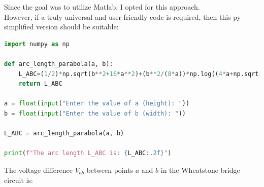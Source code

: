 \documentclass[a4paper, 12pt]{report}
\begin{document}
    Since the goal was to utilize Matlab, I opted for this approach.\\ However, if a truly universal and user-friendly code is required, then this py simplified version should be suitable:
    
    \begin{lstlisting}[style=mypythonstyle,language=Python]
import numpy as np

def arc_length_parabola(a, b):
    L_ABC=(1/2)*np.sqrt(b**2+16*a**2)+(b**2/(8*a))*np.log((4*a+np.sqrt(b**2+16*a**2))/b)
    return L_ABC

a = float(input("Enter the value of a (height): "))
b = float(input("Enter the value of b (width): "))

L_ABC = arc_length_parabola(a, b)

print(f"The arc length L_ABC is: {L_ABC:.2f}")
    \end{lstlisting}
            
    \newpage
       
    The voltage difference \(V_{ab}\) between points \(a\) and \(b\) in the Wheatstone bridge circuit is:
  
      
\end{document}
